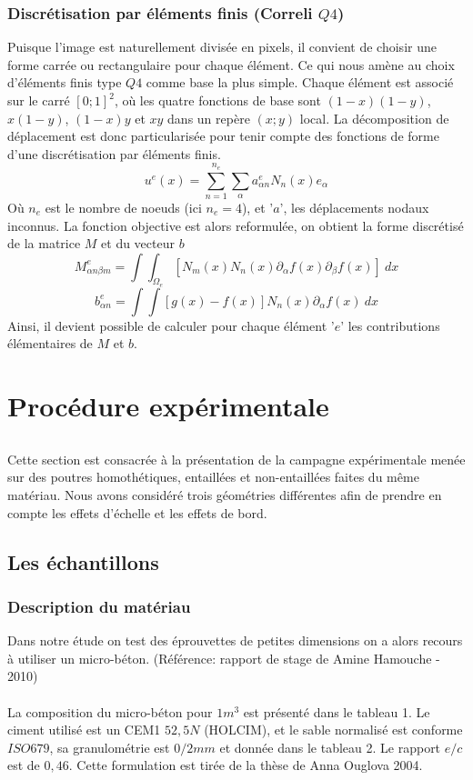\documentclass[12pt]{report}
\begin{document}
\section{Discrétisation par éléments finis (Correli $Q4$)}
Puisque l'image est naturellement divisée en pixels, il
convient de choisir une forme carrée ou rectangulaire pour chaque élément. Ce qui nous amène
au choix d'éléments finis type $Q4$ comme base la plus simple. Chaque élément est associé sur le
carré $[0 ; 1]^2$, où les quatre fonctions de base sont $(1-x)(1-y)$, $x(1-y)$, $(1-x)y$ et $xy$ dans un repère
$(x ; y)$ local. La décomposition de déplacement est donc particularisée pour tenir compte des
fonctions de forme d'une discrétisation par éléments finis.
\[u^e(x)=\sum_{n=1}^{n_e} \sum_{\alpha} a_{\alpha n}^{e}N_n(x)e_\alpha\]
Où $n_e$ est le nombre de noeuds (ici $n_e = 4$), et '$a$', les déplacements nodaux inconnus. La
fonction objective est alors reformulée, on obtient la forme discrétisé de la matrice $M$ et du
vecteur $b$
\[M_{\alpha n \beta m}^{e}=\int{\int_{\Omega_e} {[N_m(x)N_n(x)\partial_\alpha f(x)\partial_\beta f(x)]\ dx}}\]
\[b_{\alpha n}^{e}=\int{\int{[g(x)-f(x)]N_n(x)\partial_\alpha f(x)\ dx}}\]
Ainsi, il devient possible de calculer pour chaque élément '$e$' les contributions élémentaires
de $M$ et $b$.


\part{Procédure expérimentale}
\chapter*{}
Cette section est consacrée à la présentation de la campagne expérimentale menée sur des
poutres homothétiques, entaillées et non-entaillées faites du même matériau. Nous avons
considéré trois géométries différentes afin de prendre en compte les effets d'échelle et les effets
de bord.



\chapter{Les échantillons}
\section{Description du matériau}
Dans notre étude on test des éprouvettes de petites dimensions on a alors recours à utiliser un
micro-béton. (Référence: rapport de stage de Amine Hamouche - 2010)
\\\\
La composition du micro-béton pour $1m^3$ est présenté dans le tableau 1. Le ciment utilisé
est un CEM1 $52,5 N$ (HOLCIM), et le sable normalisé est conforme $ISO  679$, sa granulométrie
est $0/2 mm$ et donnée dans le tableau 2. Le rapport $e/c$ est de $0,46$. Cette formulation est tirée de
la thèse de Anna Ouglova 2004.
\end{document}
